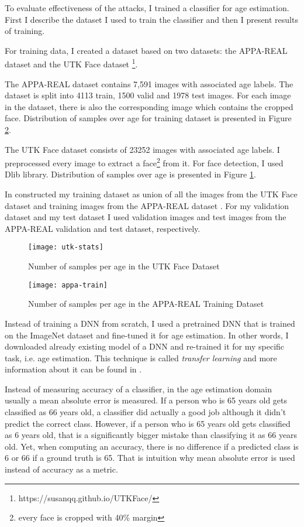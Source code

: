 To evaluate effectiveness of the attacks, I trained a classifier for age estimation. 
First I describe the dataset I used to train the classifier and then I present results of training. 

For training data, I created a dataset based on two datasets: the APPA-REAL dataset \cite{agustsson2017appareal}  and the UTK Face dataset \footnote{https://susanqq.github.io/UTKFace/}.

The APPA-REAL dataset contains 7,591 images with associated age labels. The dataset is split into 4113 train, 1500 valid and 1978 test images. For each image in the dataset, there is also the corresponding image which contains the cropped face. Distribution of samples over age for training dataset is presented in Figure \ref{fig:appa-train-stats}.

The UTK Face dataset consists of 23252 images with associated age labels. I preprocessed every image to extract a face\footnote{every face is cropped with 40\% margin} from it. For face detection, I used Dlib \cite{dlib09} library. Distribution of samples over age is presented in Figure \ref{fig:utk-stats}.

In constructed my training dataset as union of all the images from the UTK Face dataset and training images from the APPA-REAL dataset . For my validation dataset and my test dataset I used validation images and test images from the APPA-REAL validation and test dataset, respectively. 

\begin{figure}[h]
\texttt{[image: utk-stats]}
\caption{Number of samples per age in the UTK Face Dataset}
\label{fig:utk-stats}
\end{figure}

\begin{figure}[h]
\texttt{[image: appa-train]}
\caption{Number of samples per age in the APPA-REAL Training Dataset}
\label{fig:appa-train-stats}
\end{figure}

Instead of training a DNN from scratch, I used a pretrained DNN that is trained on the ImageNet dataset and fine-tuned it for age estimation. In other words, I downloaded already existing model of a DNN and re-trained it for my specific task, i.e. age estimation. This technique is called \textit{transfer learning} and more information about it can be found in \cite{yosinski2014transferable}.

Instead of measuring accuracy of a classifier, in the age estimation domain usually a mean absolute error is measured. If a person who is 65 years old gets classified as 66 years old, a classifier did actually a good job although it didn't predict the correct class. However, if a person who is 65 years old gets classified as 6 years old, that is a significantly bigger mistake than classifying it as 66 years old. Yet, when computing an accuracy, there is no difference if a predicted class is 6 or 66 if a ground truth is 65. That is intuition why mean absolute error is used instead of accuracy as a metric.

